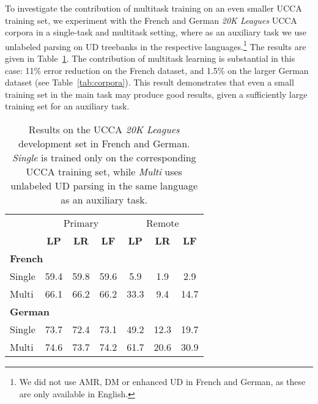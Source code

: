 \documentclass[11pt,a4paper]{article}
\begin{document}
To investigate the contribution of multitask training on an even smaller UCCA training set,
we experiment with the French and German \textit{20K Leagues} UCCA corpora
\cite{sulem2015conceptual}
in a single-task and multitask setting, where as an auxiliary task we use unlabeled parsing on
UD treebanks in the respective languages.\footnote{We did not use AMR, DM or enhanced UD in French
and German, as these are only available in English.}
The results are given in Table~\ref{tab:multilingual}.
The contribution of multitask learning is substantial in this case:
11\% error reduction on the French dataset, and 1.5\% on the larger German dataset
(see Table~\ref{tab:corpora}).
This result demonstrates that even a small training set in the main task may produce good results,
given a sufficiently large training set for an auxiliary task.

\begin{table}
\begin{tabular}{l|ccc|ccc}
& \multicolumn{3}{c|}{\footnotesize Primary} & \multicolumn{3}{c}{\footnotesize Remote} \\
& \footnotesize \textbf{LP} & \footnotesize \textbf{LR} & \footnotesize \textbf{LF}
& \footnotesize \textbf{LP} & \footnotesize \textbf{LR} & \footnotesize \textbf{LF} \\
\multicolumn{4}{l|}{\textbf{French}} & \\
\small Single & 59.4 & 59.8 & 59.6 & 5.9 & 1.9 & 2.9 \\
\small Multi & 66.1 & 66.2 & 66.2 & 33.3 & 9.4 & 14.7 \\
\hline
\multicolumn{4}{l|}{\textbf{German}} & \\
\small Single & 73.7 & 72.4 & 73.1 & 49.2 & 12.3 & 19.7 \\
\small Multi & 74.6 & 73.7 & 74.2 & 61.7 & 20.6 & 30.9
\end{tabular}
\caption{Results on the UCCA \textit{20K Leagues}
development set in French and German.
\textit{Single} is trained only on the corresponding UCCA training set,
while \textit{Multi} uses unlabeled UD parsing in the same language as an auxiliary task.
\label{tab:multilingual}}
\end{table}
\end{document}
